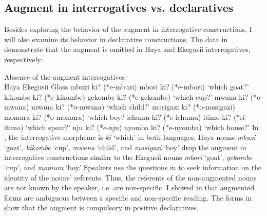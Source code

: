 \documentclass[output=paper]{langscibook}
\begin{document}
\subsection{Augment in interrogatives vs. declaratives}\label{sec:choti:5.2}
Besides exploring the behavior of the augment in interrogative constructions, I will also examine its behavior in declarative constructions.  The data in  demonstrate that the augment is omitted in Haya and Ekegusii interrogatives, respectively:

\ea Absence of the augment interrogatives\smallskip\\
\label{hayagusii25}
             \hphantom{abc }Haya				\hphantom{azi ki? (*o-musigazi) }Ekegusii			\hphantom{ ki? (*e-gekombe) }Gloss
  \ea\label{hayagusii25a}	mbuzi ki? (*e-mbuzi)\hphantom{sigazi}		mbori ki? (*e-mbori)\hphantom{iombe} 		‘which goat?’
  \ex\label{hayagusii25b}	kikombe ki? (*e-kikombe)\hphantom{i} 	gekombe ki? (*e-gekombe) 	‘which cup?’
  \ex\label{hayagusii25c}	mwana ki? (*o-mwana)\hphantom{itzi} 	mwana ki? (*o-mwana)\hphantom{tbe} 	‘which child?’
  \ex\label{hayagusii25d}	musigazi ki? (*o-musigazi) 	momura ki? (*o-momura)\hphantom{t} 	‘which boy?
  \ex\label{hayagusii25e}	ichumu ki? (*e-ichumu)\hphantom{azi} 	itimo ki? (*ri-itimo)\hphantom{komoe}		‘which spear?’
  \ex\label{hayagusii25f}	nju ki?	(*e-nju)\hphantom{o-musigazt}		nyomba ki? (*e-nyomba)\hphantom{io}	‘which house?’
  \z
\z
In , the interrogative morpheme is \textit{ki} ‘which’ in both languages. Haya nouns \textit{mbuzi} ‘goat’, \textit{kikombe} ‘cup’, \textit{mwana} ‘child’, and \textit{musigazi} ‘boy’ drop the augment in interrogative constructions similar to the Ekegusii nouns \textit{mbori} ‘goat’, \textit{gekombe} ‘cup’, and \textit{momura} ‘boy.' Speakers use the questions in  to seek information on the identity of the nouns’ referents. Thus, the referents of the non-augmented nouns are not known by the speaker, i.e. are non-specific. I showed in  that augmented forms are ambiguous between a specific and non-specific reading. The forms in  show that the augment is compulsory in positive declaratives.\largerpage
\end{document}

